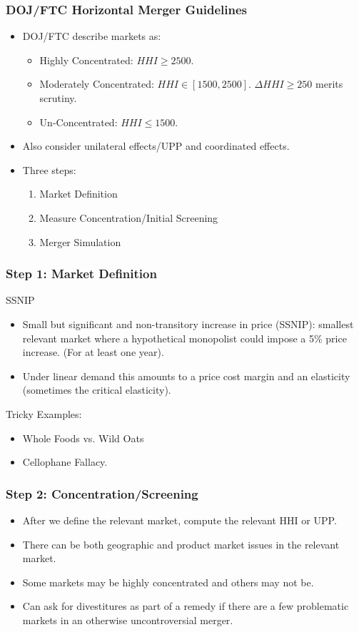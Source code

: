 \documentclass[xcolor=pdftex,dvipsnames,table,mathserif,aspectratio=169]{beamer}
\begin{document}
\begin{frame}
\frametitle{DOJ/FTC Horizontal Merger Guidelines}
 \begin{itemize}
\item DOJ/FTC describe markets as:
\begin{itemize}
\item Highly Concentrated: $HHI \geq 2500$.
\item Moderately Concentrated: $HHI \in [1500,2500]$. $\Delta HHI \geq 250$ merits scrutiny.
\item Un-Concentrated: $HHI \leq 1500$.
\end{itemize}
\item Also consider \alert{unilateral effects}/UPP and \alert{coordinated effects}.
\item Three steps:
\begin{enumerate}
\item Market Definition
\item Measure Concentration/Initial Screening
\item Merger Simulation
\end{enumerate}
 \end{itemize}
\end{frame}

\begin{frame}
\frametitle{Step 1: Market Definition}
SSNIP
 \begin{itemize}
\item Small but significant and non-transitory increase in price (SSNIP): smallest relevant market where a hypothetical monopolist could impose a 5\% price increase. (For at least one year).
\item Under linear demand this amounts to a price cost margin and an elasticity (sometimes the \alert{critical elasticity}).
 \end{itemize}
 Tricky Examples:
  \begin{itemize}
\item Whole Foods vs. Wild Oats
\item Cellophane Fallacy.
 \end{itemize}
\end{frame}

\begin{frame}
\frametitle{Step 2: Concentration/Screening}
 \begin{itemize}
\item After we define the relevant market, compute the relevant HHI or UPP.
\item There can be both geographic and product market issues in the relevant market.
\item Some markets may be highly concentrated and others may not be.
\item Can ask for \alert{divestitures} as part of a \alert{remedy} if there are a few problematic markets in an otherwise uncontroversial merger.
 \end{itemize}
\end{frame}
\end{document}
